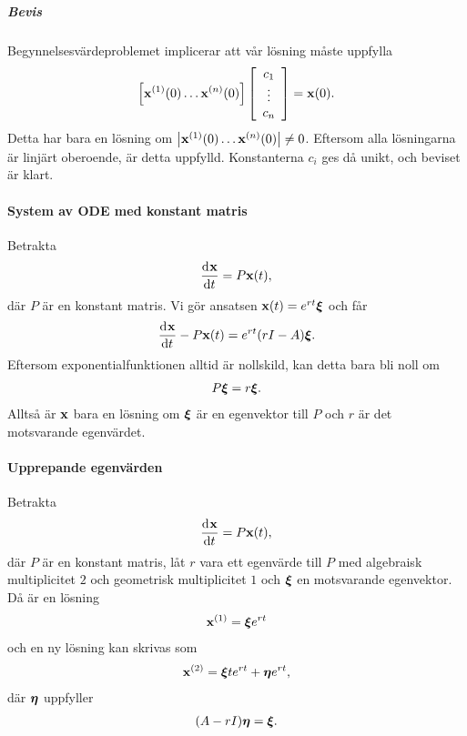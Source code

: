 \subparagraph{Bevis}
Begynnelsesvärdeproblemet implicerar att vår lösning måste uppfylla
\begin{align*}
	\left[\vb{x}^{(1)}(0) \dots \vb{x}^{(n)}(0)\right]
	\left[\begin{array}{c}
		c_{1} \\
		\vdots \\
		c_{n}
	\end{array}\right]
	= \vb{x}(0).
\end{align*}
Detta har bara en lösning om $\abs{\vb{x}^{(1)}(0) \dots \vb{x}^{(n)}(0)} \neq 0$. Eftersom alla lösningarna är linjärt oberoende, är detta uppfylld. Konstanterna $c_{i}$ ges då unikt, och beviset är klart.

\paragraph{System av ODE med konstant matris}
Betrakta
\begin{align*}
	\dv[]{\vb{x}}{t} (t) = P\vb{x}(t),
\end{align*}
där $P$ är en konstant matris. Vi gör ansatsen $\vb{x}(t) = e^{rt}\vb*{\xi}$ och får
\begin{align*}
	\dv[]{\vb{x}}{t} (t) - P\vb{x}(t) = e^{rt}(rI - A)\vb*{\xi}.
\end{align*}
Eftersom exponentialfunktionen alltid är nollskild, kan detta bara bli noll om
\begin{align*}
	P\vb*{\xi} = r\vb*{\xi}.
\end{align*}
Alltså är $\vb{x}$ bara en lösning om $\vb*{\xi}$ är en egenvektor till $P$ och $r$ är det motsvarande egenvärdet.

\paragraph{Upprepande egenvärden}
Betrakta
\begin{align*}
	\dv[]{\vb{x}}{t} (t) = P\vb{x}(t),
\end{align*}
där $P$ är en konstant matris, låt $r$ vara ett egenvärde till $P$ med algebraisk multiplicitet $2$ och geometrisk multiplicitet $1$ och $\vb*{\xi}$ en motsvarande egenvektor. Då är en lösning
\begin{align*}
	\vb{x}^{(1)} = \vb*{\xi}e^{rt}
\end{align*}
och en ny lösning kan skrivas som
\begin{align*}
	\vb{x}^{(2)} = \vb*{\xi}te^{rt} + \vb*{\eta}e^{rt},
\end{align*}
där $\vb*{\eta}$ uppfyller
\begin{align*}
	(A - rI)\vb*{\eta} = \vb*{\xi}.
\end{align*}


